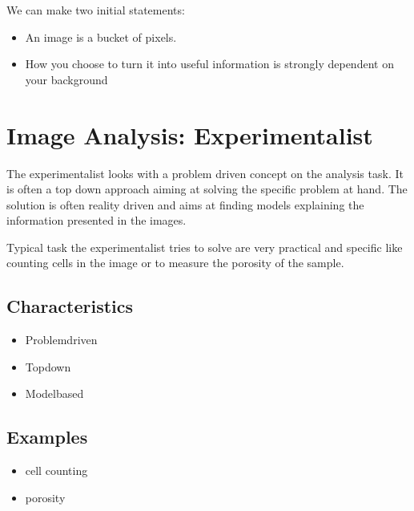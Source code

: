 \documentclass[letterpaper,10pt,english]{sphinxmanual}
\begin{document}
\sphinxAtStartPar
We can make two initial statements:


\begin{itemize}
\item {} 
\sphinxAtStartPar
An image is a bucket of pixels.

\item {} 
\sphinxAtStartPar
How you choose to turn it into useful information is strongly dependent on your background

\end{itemize}


\section{Image Analysis: Experimentalist}
\label{\detokenize{01-Introduction:image-analysis-experimentalist}}
\sphinxAtStartPar
The experimentalist looks with a problem driven concept on the analysis task. It is often a top down approach aiming at solving the specific problem at hand. The solution is often reality driven and aims at finding models explaining the information presented in the images.

\sphinxAtStartPar
Typical task the experimentalist tries to solve are very practical and specific like counting cells in the image or to measure the porosity of the sample.




\subsection{Characteristics}
\label{\detokenize{01-Introduction:characteristics}}\begin{itemize}
\item {} 
\sphinxAtStartPar
Problem\sphinxhyphen{}driven

\item {} 
\sphinxAtStartPar
Top\sphinxhyphen{}down

\item {} 
\sphinxAtStartPar
{} Model\sphinxhyphen{}based

\end{itemize}


\subsection{Examples}
\label{\detokenize{01-Introduction:examples}}\begin{itemize}
\item {} 
\sphinxAtStartPar
cell counting

\item {} 
\sphinxAtStartPar
porosity

\end{itemize}
\end{document}
